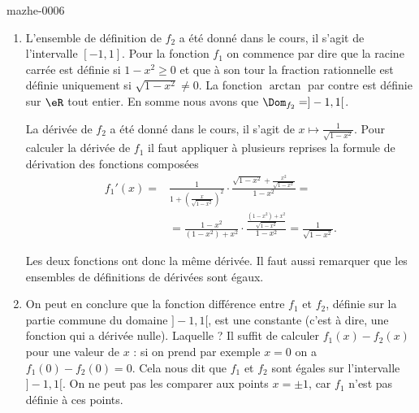 

\begin{corrige}{mazhe-0006}

  \begin{enumerate}
  \item L'ensemble de définition de $f_2$ a été donné dans le cours, il s'agit de l'intervalle $[-1,1]$. Pour la fonction $f_1$ on commence par dire que la racine carrée est définie si $1-x^2 \geq 0$ et que à son tour la fraction rationnelle est définie uniquement si $\sqrt{1-x^2}\neq 0$. La fonction $\arctan$ par contre est définie sur $\eR$ tout entier. En somme nous avons que $\Dom_{f_2} = ]-1,1[$.

La dérivée de  $f_2$ a été donné dans le cours, il s'agit de $\displaystyle x\mapsto \frac{1}{\sqrt{1-x^2}}$. Pour calculer la dérivée de $f_1$ il faut appliquer à plusieurs reprises la formule de dérivation des fonctions composées
\begin{equation*}
  \begin{aligned}
    f_1' (x) = &\frac{1}{1+\left(\frac{x}{\sqrt{1-x^2}}\right)^2} \cdot \frac{\sqrt{1-x^2} + \frac{x^2}{\sqrt{1-x^2}}}{1-x^2} = \\
    &= \frac{1-x^2}{(1-x^2) +x^2}\cdot\frac{\frac{(1-x^2) +x^2}{\sqrt{1-x^2}}}{1-x^2} =\frac{1}{\sqrt{1-x^2}}.
  \end{aligned}
\end{equation*}

Les deux fonctions ont donc la m\^eme dérivée. Il faut aussi remarquer que les ensembles de définitions de dérivées sont égaux. 
  \item On peut en conclure que la fonction différence entre $f_1$ et $f_2$, définie sur la partie commune du domaine $]-1,1[$,  est une constante (c'est à dire, une fonction qui a dérivée nulle). Laquelle ? Il suffit de calculer $f_1(x)-f_2(x)$ pour une valeur de $x$ : si on prend par exemple $x =0$ on a $f_1(0) -f_2(0) =0$. Cela nous dit que $f_1$ et $f_2$ sont égales sur l'intervalle $]-1,1[$. On ne peut pas les comparer aux points $x = \pm 1$, car $f_1$ n'est pas définie à ces points.
  \end{enumerate}
\end{corrige}
